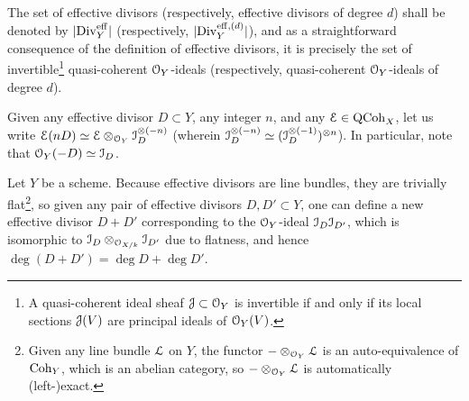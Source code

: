             \begin{convention}
                The set of effective divisors (respectively, effective divisors of degree $d$) shall be denoted by $|\mathrm{Div}_Y^{\mathrm{eff}}|$ (respectively, $|\mathrm{Div}_Y^{\mathrm{eff}, (d)}|$), and as a straightforward consequence of the definition of effective divisors, it is precisely the set of invertible\footnote{A quasi-coherent ideal sheaf $\mathcal{J} \subset \mathcal{O}_Y$ is invertible if and only if its local sections $\mathcal{J}(V)$ are principal ideals of $\mathcal{O}_Y(V)$.} quasi-coherent $\mathcal{O}_Y$-ideals (respectively, quasi-coherent $\mathcal{O}_Y$-ideals of degree $d$).
            \end{convention}
            \begin{convention}
                Given any effective divisor $D \subset Y$, any integer $n$, and any $\mathcal{E} \in \mathrm{QCoh}_X$, let us write $\E(nD) \cong \E \tensor_{\calO_Y} \calI_D^{\tensor (-n)}$ (wherein $\calI_D^{\tensor (-n)} \cong (\calI_D^{\tensor (-1)})^{\tensor n}$). In particular, note that $\mathcal{O}_Y(-D) \simeq \mathcal{I}_D$.
            \end{convention}
            \begin{remark} \label{remark: adding_effective_divisors}
                Let $Y$ be a scheme. Because effective divisors are line bundles, they are trivially flat\footnote{Given any line bundle $\mathcal{L}$ on $Y$, the functor $- \tensor_{\calO_Y} \calL$ is an auto-equivalence of $\mathrm{Coh}_Y$, which is an abelian category, so $- \tensor_{\calO_Y} \calL$ is automatically (left-)exact.}, so given any pair of effective divisors $D, D' \subset Y$, one can define a new effective divisor $D + D'$ corresponding to the $\mathcal{O}_Y$-ideal $\mathcal{I}_D \mathcal{I}_{D'}$, which is isomorphic to $\calI_D \tensor_{\calO_{X/k}} \calI_{D'}$ due to flatness, and hence $\deg(D + D') = \deg D + \deg D'$.
            \end{remark}
            
